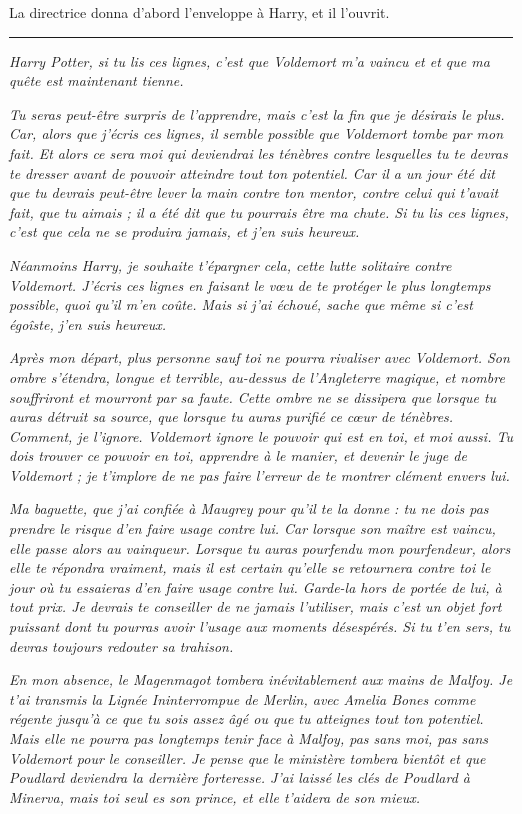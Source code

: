 La directrice donna d'abord l'enveloppe à Harry, et il l'ouvrit.
\par\noindent\rule{\textwidth}{0.4pt}
\emph{Harry Potter, si tu lis ces lignes, c'est que Voldemort m'a vaincu et et que ma quête est maintenant tienne.} 

\emph{Tu seras peut-être surpris de l'apprendre, mais c'est la fin que je désirais le plus. Car, alors que j'écris ces lignes, il semble possible que Voldemort tombe par mon fait. Et alors ce sera moi qui deviendrai les ténèbres contre lesquelles tu te devras te dresser avant de pouvoir atteindre tout ton potentiel. Car il a un jour été dit que tu devrais peut-être lever la main contre ton mentor, contre celui qui t'avait fait, que tu aimais ; il a été dit que tu pourrais être ma chute. Si tu lis ces lignes, c'est que cela ne se produira jamais, et j'en suis heureux.} 

\emph{Néanmoins Harry, je souhaite t'épargner cela, cette lutte solitaire contre Voldemort. J'écris ces lignes en faisant le vœu de te protéger le plus longtemps possible, quoi qu'il m'en coûte. Mais si j'ai échoué, sache que même si c'est égoîste, j'en suis heureux.} 

\emph{Après mon départ, plus personne sauf toi ne pourra rivaliser avec Voldemort. Son ombre s'étendra, longue et terrible, au-dessus de l'Angleterre magique, et nombre souffriront et mourront par sa faute. Cette ombre ne se dissipera que lorsque tu auras détruit sa source, que lorsque tu auras purifié ce cœur de ténèbres. Comment, je l'ignore. Voldemort ignore le pouvoir qui est en toi, et moi aussi. Tu dois trouver ce pouvoir en toi, apprendre à le manier, et devenir le juge de Voldemort ; je t'implore de ne pas faire l'erreur de te montrer clément envers lui.} 

\emph{Ma baguette, que j'ai confiée à Maugrey pour qu'il te la donne : tu ne dois pas prendre le risque d'en faire usage contre lui. Car lorsque son maître est vaincu, elle passe alors au vainqueur. Lorsque tu auras pourfendu mon pourfendeur, alors elle te répondra vraiment, mais il est certain qu'elle se retournera contre toi le jour où tu essaieras d'en faire usage contre lui. Garde-la hors de portée de lui, à tout prix. Je devrais te conseiller de ne jamais l'utiliser, mais c'est un objet fort puissant dont tu pourras avoir l'usage aux moments désespérés. Si tu t'en sers, tu devras toujours redouter sa trahison.} 

\emph{En mon absence, le Magenmagot tombera inévitablement aux mains de Malfoy. Je t'ai transmis la Lignée Ininterrompue de Merlin, avec Amelia Bones comme régente jusqu'à ce que tu sois assez âgé ou que tu atteignes tout ton potentiel. Mais elle ne pourra pas longtemps tenir face à Malfoy, pas sans moi, pas sans Voldemort pour le conseiller. Je pense que le ministère tombera bientôt et que Poudlard deviendra la dernière forteresse. J'ai laissé les clés de Poudlard à Minerva, mais toi seul es son prince, et elle t'aidera de son mieux.} 

